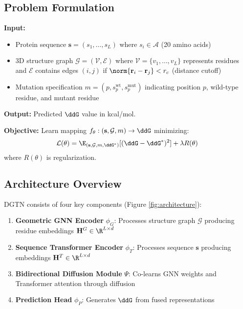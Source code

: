 \documentclass[12pt,en]{elegantpaper}
\begin{document}
\subsection{Problem Formulation}

\textbf{Input:} 
\begin{itemize}
    \item Protein sequence $\mathbf{s} = (s_1, \ldots, s_L)$ where $s_i \in \mathcal{A}$ (20 amino acids)
    \item 3D structure graph $\mathcal{G} = (\mathcal{V}, \mathcal{E})$ where $\mathcal{V} = \{v_1, \ldots, v_L\}$ represents residues and $\mathcal{E}$ contains edges $(i,j)$ if $\norm{\mathbf{r}_i - \mathbf{r}_j} < r_c$ (distance cutoff)
    \item Mutation specification $m = (p, s_p^{\text{wt}}, s_p^{\text{mut}})$ indicating position $p$, wild-type residue, and mutant residue
\end{itemize}

\textbf{Output:} Predicted $\ddG$ value in kcal/mol.

\textbf{Objective:} Learn mapping $f_\theta: (\mathbf{s}, \mathcal{G}, m) \rightarrow \ddG$ minimizing:
\begin{equation}
    \mathcal{L}(\theta) = \E_{(\mathbf{s}, \mathcal{G}, m, \ddG^*)} [(\ddG - \ddG^*)^2] + \lambda R(\theta)
\end{equation}
where $R(\theta)$ is regularization.

\subsection{Architecture Overview}
\label{sec:architecture}

DGTN consists of four key components (Figure \ref{fig:architecture}):

\begin{enumerate}
    \item \textbf{Geometric GNN Encoder} $\phi_G$: Processes structure graph $\mathcal{G}$ producing residue embeddings $\mathbf{H}^G \in \R^{L \times d}$
    \item \textbf{Sequence Transformer Encoder} $\phi_T$: Processes sequence $\mathbf{s}$ producing embeddings $\mathbf{H}^T \in \R^{L \times d}$
    \item \textbf{Bidirectional Diffusion Module} $\Psi$: Co-learns GNN weights and Transformer attention through diffusion
    \item \textbf{Prediction Head} $\phi_P$: Generates $\ddG$ from fused representations
\end{enumerate}
\end{document}
